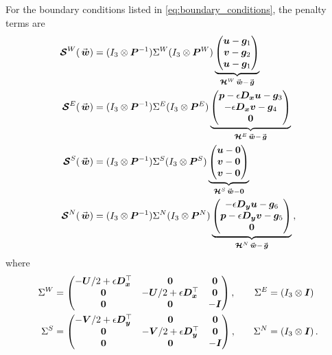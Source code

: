 For the boundary conditions listed in \eqref{eq:boundary_conditions}, the penalty terms are
\begin{equation}
\begin{aligned}
   \satn^W(\wn) & = (I_3\otimes \Pn^{-1})
    \Sigma^W
   (I_3\otimes \Pn^W)
   \underbrace{
   \begin{pmatrix}
      \un - \gn_1
      \\
      \vn - \gn_2
      \\
      \un - \gn_1
   \end{pmatrix}
   }_{\Hn^W\wn - \vecs{\gn}}
   \\
   \satn^E(\wn) & = (I_3\otimes \Pn^{-1}) 
   \Sigma^E
   (I_3\otimes \Pn^E)
   \underbrace{
   \begin{pmatrix}
      \pn - \epsilon \Dx \un - \gn_3
      \\
      -\epsilon \Dx \vn - \gn_4
      \\
      \zeron
   \end{pmatrix}
   }_{\Hn^E\wn - \vecs{\gn}}
  \\
  \satn^S(\wn) & = (I_3\otimes \Pn^{-1})
  \Sigma^S(I_3\otimes \Pn^S)
   \underbrace{
   \begin{pmatrix}
      \un - \zeron
      \\
      \vn - \zeron
      \\
      \vn - \zeron
   \end{pmatrix}
   }_{\Hn^S\wn - \zeron}
   \\
  \satn^N(\wn) & = (I_3\otimes \Pn^{-1}) 
  \Sigma^N
   (I_3\otimes \Pn^N)
   \underbrace{
   \begin{pmatrix}
      - \epsilon \Dy \un - \gn_6
      \\
      \pn -\epsilon \Dy \vn - \gn_5
      \\
      \zeron
   \end{pmatrix}
   }_{\Hn^N\wn - \vecs{\gn}}
   \, ,
  \end{aligned}
\label{eq:penalty_terms}
\end{equation}
where 
\begin{align*}
   \Sigma^W & = 
   \begin{pmatrix}
      -\bm{U}/2 + \epsilon \bm{D_x}^\top & \bm{0} & \bm{0}
      \\
      \bm{0} & -\bm{U}/2 + \epsilon \bm{D_x}^\top & \bm{0}
      \\
      \bm{0} & \bm{0} & -\bm{I}
   \end{pmatrix}
   ,
   \quad
   &\Sigma^E & = (I_3\otimes \bm{I})
   \\
   \Sigma^S & = 
    \begin{pmatrix}
      -\bm{V}/2 + \epsilon \bm{D_y}^\top & \bm{0} & \bm{0}
      \\
      \bm{0} & -\bm{V}/2 + \epsilon \bm{D_y}^\top & \bm{0}
      \\
      \bm{0} & \bm{0} & -\bm{I} 
   \end{pmatrix}
   ,
   \quad
   &\Sigma^N & = (I_3\otimes \bm{I})
   \, .
\end{align*}
